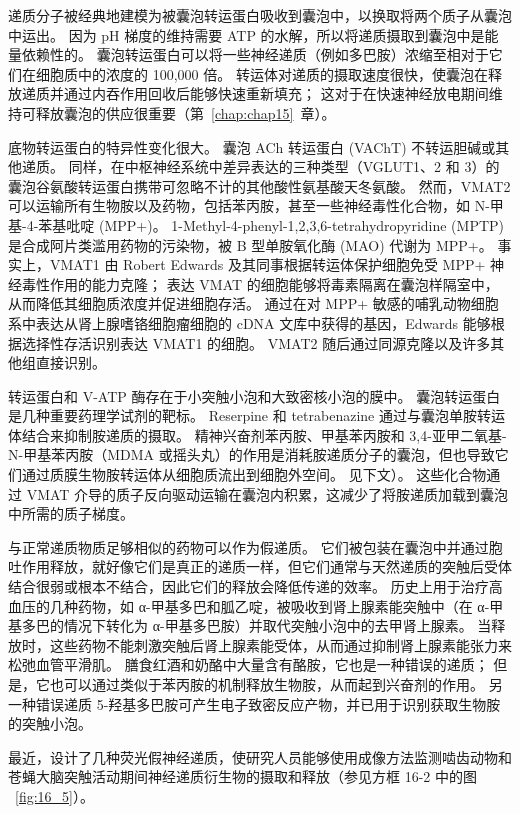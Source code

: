 \begin{figure}[htbp]
	\label{fig:16_1}
\end{figure}


递质分子被经典地建模为被囊泡转运蛋白吸收到囊泡中，以换取将两个质子从囊泡中运出。
因为 pH 梯度的维持需要 ATP 的水解，所以将递质摄取到囊泡中是能量依赖性的。
囊泡转运蛋白可以将一些神经递质（例如多巴胺）浓缩至相对于它们在细胞质中的浓度的 100,000 倍。
转运体对递质的摄取速度很快，使囊泡在释放递质并通过内吞作用回收后能够快速重新填充；
这对于在快速神经放电期间维持可释放囊泡的供应很重要（第~\ref{chap:chap15}~章）。


底物转运蛋白的特异性变化很大。
囊泡 ACh 转运蛋白 (VAChT) 不转运胆碱或其他递质。
同样，在中枢神经系统中差异表达的三种类型（VGLUT1、2 和 3）的囊泡谷氨酸转运蛋白携带可忽略不计的其他酸性氨基酸天冬氨酸。
然而，VMAT2 可以运输所有生物胺以及药物，包括苯丙胺，甚至一些神经毒性化合物，如 N-甲基-4-苯基吡啶 (MPP+)。
1-Methyl-4-phenyl-1,2,3,6-tetrahydropyridine (MPTP) 是合成阿片类滥用药物的污染物，被 B 型单胺氧化酶 (MAO) 代谢为 MPP+。
事实上，VMAT1 由 Robert Edwards 及其同事根据转运体保护细胞免受 MPP+ 神经毒性作用的能力克隆； 表达 VMAT 的细胞能够将毒素隔离在囊泡样隔室中，从而降低其细胞质浓度并促进细胞存活。
通过在对 MPP+ 敏感的哺乳动物细胞系中表达从肾上腺嗜铬细胞瘤细胞的 cDNA 文库中获得的基因，Edwards 能够根据选择性存活识别表达 VMAT1 的细胞。
VMAT2 随后通过同源克隆以及许多其他组直接识别。


转运蛋白和 V-ATP 酶存在于小突触小泡和大致密核小泡的膜中。
囊泡转运蛋白是几种重要药理学试剂的靶标。 Reserpine 和 tetrabenazine 通过与囊泡单胺转运体结合来抑制胺递质的摄取。
精神兴奋剂苯丙胺、甲基苯丙胺和 3,4-亚甲二氧基-N-甲基苯丙胺（MDMA 或摇头丸）的作用是消耗胺递质分子的囊泡，但也导致它们通过质膜生物胺转运体从细胞质流出到细胞外空间。 见下文）。
这些化合物通过 VMAT 介导的质子反向驱动运输在囊泡内积累，这减少了将胺递质加载到囊泡中所需的质子梯度。


与正常递质物质足够相似的药物可以作为假递质。
它们被包装在囊泡中并通过胞吐作用释放，就好像它们是真正的递质一样，但它们通常与天然递质的突触后受体结合很弱或根本不结合，因此它们的释放会降低传递的效率。
历史上用于治疗高血压的几种药物，如 α-甲基多巴和胍乙啶，被吸收到肾上腺素能突触中（在 α-甲基多巴的情况下转化为 α-甲基多巴胺）并取代突触小泡中的去甲肾上腺素。
当释放时，这些药物不能刺激突触后肾上腺素能受体，从而通过抑制肾上腺素能张力来松弛血管平滑肌。
膳食红酒和奶酪中大量含有酪胺，它也是一种错误的递质；
但是，它也可以通过类似于苯丙胺的机制释放生物胺，从而起到兴奋剂的作用。
另一种错误递质 5-羟基多巴胺可产生电子致密反应产物，并已用于识别获取生物胺的突触小泡。


最近，设计了几种荧光假神经递质，使研究人员能够使用成像方法监测啮齿动物和苍蝇大脑突触活动期间神经递质衍生物的摄取和释放（参见方框 16-2 中的图 ~\ref{fig:16_5}）。


